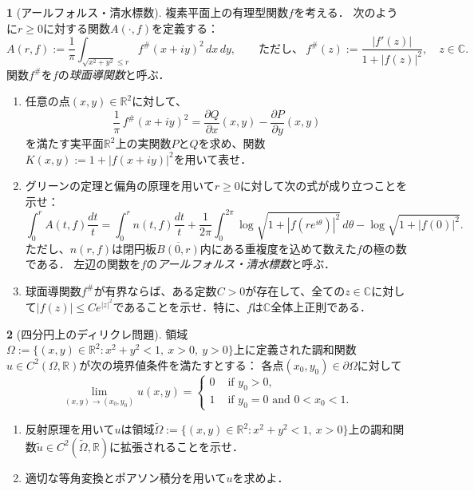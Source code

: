 \documentclass[a4paper]{article}
\theoremstyle{definition}
\newtheorem{prb}{}
\newcommand{\C}{\mathbb{C}}
\newcommand{\R}{\mathbb{R}}
\renewcommand{\tilde}{\widetilde}
\renewcommand{\bar}{\overline}
\begin{document}
\begin{prb}[アールフォルス・清水標数]
複素平面上の有理型関数$f$を考える．
次のように$r\ge0$に対する関数$A(\cdot,f)$を定義する：
\[A(r,f):=\frac1\pi\int_{\sqrt{x^2+y^2}\le r}f^\#(x+iy)^2\,dx\,dy,\qquad\text{ただし、}\ f^\#(z):=\frac{|f'(z)|}{1+|f(z)|^2},\quad z\in\C.\]
関数$f^\#$を$f$の\emph{球面導関数}と呼ぶ．
\begin{enumerate}[label=(\arabic*)]
\item 任意の点$(x,y)\in\R^2$に対して、
\[\frac1\pi\,f^\#(x+iy)^2=\frac{\partial Q}{\partial x}(x,y)-\frac{\partial P}{\partial y}(x,y)\]
を満たす実平面$\R^2$上の実関数$P$と$Q$を求め、関数$K(x,y):=1+|f(x+iy)|^2$を用いて表せ．
\item グリーンの定理と偏角の原理を用いて$r\ge0$に対して次の式が成り立つことを示せ：
\[\int_0^rA(t,f)\frac{dt}t=\int_0^rn(t,f)\frac{dt}t+\frac1{2\pi}\int_0^{2\pi}\log\sqrt{1+|f(re^{i\theta})|^2}\,d\theta-\log\sqrt{1+|f(0)|^2}.\]
ただし、$n(r,f)$は閉円板$\bar{B(0,r)}$内にある重複度を込めて数えた$f$の極の数である．
左辺の関数を$f$の\emph{アールフォルス・清水標数}と呼ぶ．
\item 球面導関数$f^\#$が有界ならば、ある定数$C>0$が存在して、全ての$z\in\C$に対して$|f(z)|\le Ce^{|z|^2}$であることを示せ．特に、$f$は$\C$全体上正則である．
\end{enumerate}
\end{prb}

\begin{prb}[四分円上のディリクレ問題]
領域$\Omega:=\{(x,y)\in\R^2:x^2+y^2<1,\ x>0,\ y>0\}$上に定義された調和関数$u\in C^2(\Omega,\R)$が次の境界値条件を満たすとする：
各点$(x_0,y_0)\in\partial\Omega$に対して
\[\lim_{(x,y)\to(x_0,y_0)}u(x,y)=\begin{cases}
0&\text{ if }y_0>0,\\
1&\text{ if }y_0=0\text{ and }0<x_0<1.
\end{cases}\]
\begin{enumerate}[label=(\arabic*)]
\item 反射原理を用いて$u$は領域$\tilde\Omega:=\{(x,y)\in\R^2:x^2+y^2<1,\ x>0\}$上の調和関数$\tilde u\in C^2(\tilde\Omega,\R)$に拡張されることを示せ．
\item 適切な等角変換とポアソン積分を用いて$u$を求めよ．
\end{enumerate}
\end{prb}


\newpage
\end{document}
